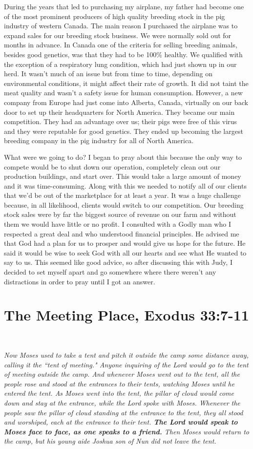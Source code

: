 \documentclass[oneside,12pt]{book}
\begin{document}
During the years that led to purchasing my airplane, my father had become one of the most prominent producers of high quality breeding stock in the pig industry of western Canada. The main reason I purchased the airplane was to expand sales for our breeding stock business. We were normally sold out for months in advance. In Canada one of the criteria for selling breeding animals, besides good genetics, was that they had to be 100\% healthy. We qualified with the exception of a respiratory lung condition, which had just shown up in our herd. It wasn't much of an issue but from time to time, depending on environmental conditions, it might affect their rate of growth. It did not taint the meat quality and wasn't a safety issue for human consumption. However, a new company from Europe had just come into Alberta, Canada, virtually on our back door to set up their headquarters for North America. They became our main competition. They had an advantage over us; their pigs were free of this virus and they were reputable for good genetics. They ended up becoming the largest breeding company in the pig industry for all of North America. 

What were we going to do? I began to pray about this because the only way to compete would be to shut down our operation, completely clean out our production buildings, and start over. This would take a large amount of money and it was time-consuming. Along with this we needed to notify all of our clients that we'd be out of the marketplace for at least a year. It was a huge challenge because, in all likelihood, clients would switch to our competition. Our breeding stock sales were by far the biggest source of revenue on our farm and without them we would have little or no profit. I consulted with a Godly man who I respected a great deal and who understood financial principles. He advised me that God had a plan for us to prosper and would give us hope for the future. He said it would be wise to seek God with all our hearts and see what He wanted to say to us. This seemed like good advice, so after discussing this with Judy, I decided to set myself apart and go somewhere where there weren't any distractions in order to pray until I got an answer.


\section{The Meeting Place, Exodus 33:7-11}
\

\textit{Now Moses used to take a tent and pitch it outside the camp some distance away, calling it the ``tent of meeting." Anyone inquiring of the Lord would go to the tent of meeting outside the camp. And whenever Moses went out to the tent, all the people rose and stood at the entrances to their tents, watching Moses until he entered the tent. As Moses went into the tent, the pillar of cloud would come down and stay at the entrance, while the Lord spoke with Moses. Whenever the people saw the pillar of cloud standing at the entrance to the tent, they all stood and worshiped, each at the entrance to their tent. \textbf{The Lord would speak to Moses face to face, as one speaks to a friend.} Then Moses would return to the camp, but his young aide Joshua son of Nun did not leave the tent.}
\end{document}
